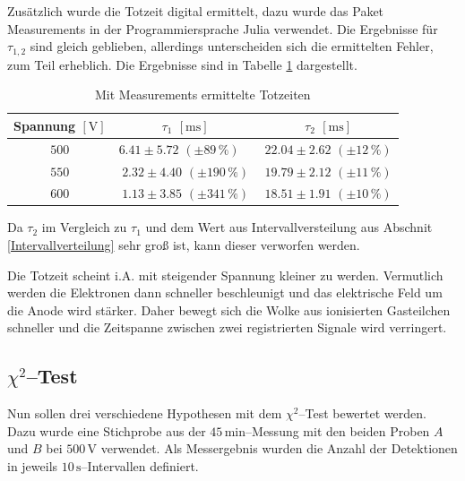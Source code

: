 \documentclass[12pt,a4paper]{scrartcl}
\numberwithin{equation}{section} %
\newcommand{\code}[1]{\textsf{#1}}
\begin{document}
\noindent
Zusätzlich wurde die Totzeit digital ermittelt, dazu wurde das Paket \code{Measurements} in der Programmiersprache \code{Julia} verwendet. \cite{Julia:Measurements} Die Ergebnisse für $\tau _{1,2}$ sind gleich geblieben, allerdings unterscheiden sich die ermittelten Fehler, zum Teil erheblich. Die Ergebnisse sind in Tabelle \ref{tab:Totzeit m. Julia} dargestellt.

\begin{table}[h!]
	\centering
	\begin{tabular}[h]{c|c|c}
		Spannung $[\mathrm V]$
			& $\tau_1$ $[\mathrm{ms}]$
			& $\tau_2$ $[\mathrm{ms}]$ \\
		\hline
		$500$ & $6.41 \pm 5.72$ $(\pm 89 \,\%)$\ \  & $22.04 \pm 2.62$ $(\pm 12 \,\%)$ \\
		$550$ & $2.32 \pm 4.40$ $(\pm 190 \,\%)$ & $19.79 \pm 2.12$ $(\pm 11 \,\%)$ \\
		$600$ & $1.13 \pm 3.85$ $(\pm 341 \,\%)$ & $18.51 \pm 1.91$ $(\pm 10 \,\%)$ \\
	\end{tabular}
	\caption{Mit \code{Measurements} \cite{Julia:Measurements} ermittelte Totzeiten}
	\label{tab:Totzeit m. Julia}
\end{table}

\noindent
Da $\tau _2$ im Vergleich zu $\tau _1$ und dem Wert aus Intervallversteilung aus Abschnit \ref{Intervallverteilung} sehr groß ist, kann dieser verworfen werden.

Die Totzeit scheint i.A. mit steigender Spannung kleiner zu werden. Vermutlich werden die Elektronen dann schneller beschleunigt und das elektrische Feld um die Anode wird stärker. Daher bewegt sich die Wolke aus ionisierten Gasteilchen schneller und die Zeitspanne zwischen zwei registrierten Signale wird verringert.

\hypertarget{chi2test}{\subsection{$\chi^2$--Test}\label{chi2test}}

Nun sollen drei verschiedene Hypothesen mit dem $\chi^2$--Test bewertet werden. Dazu wurde eine Stichprobe aus der $45\mathrm{\,min}$--Messung mit den beiden Proben $A$ und $B$ bei $500\mathrm{\,V}$ verwendet. Als Messergebnis wurden die Anzahl der Detektionen in jeweils $10\mathrm{\,s}$--Intervallen definiert.
\end{document}
